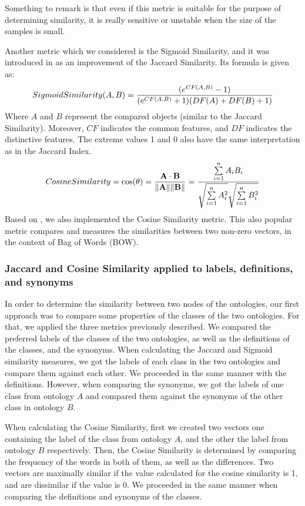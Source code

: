 \documentclass[runningheads]{llncs}
\begin{document}
Something to remark is that even if this metric is suitable for the purpose of determining similarity, it is really sensitive or unstable when the size of the samples is small. \cite{ref_url4}

Another metric which we considered is the Sigmoid Similarity, and it was introduced in \cite{Likavec} as an improvement of the Jaccard Similarity. Its formula is given as:
\small
\begin{equation}
    Sigmoid Similarity (A,B) = {{(e^{CF(A,B)} - 1)} \over{(e^{CF(A,B)} + 1) (DF(A) + DF(B) + 1)}}
\end{equation}
\normalsize
Where $A$ and $B$ represent the compared objects (similar to the Jaccard Similarity). Moreover, $CF$ indicates the common features, and $DF$ indicates the distinctive features. The extreme values 1 and 0 also have the same interpretation as in the Jaccard Index.
\small
\begin{equation}
  Cosine Similarity=\cos(\theta )={\mathbf {A} \cdot \mathbf {B}  \over \|\mathbf {A} \|\|\mathbf {B} \|}={\frac {\sum \limits _{i=1}^{n}{A_{i}B_{i}}}{{\sqrt {\sum \limits _{i=1}^{n}{A_{i}^{2}}}}{\sqrt {\sum \limits _{i=1}^{n}{B_{i}^{2}}}}}}
\end{equation}
\normalsize
Based on \cite{Oliveira}, we also implemented the Cosine Similarity metric. This also popular metric compares and measures the similarities between two non-zero vectors, in the context of Bag of Words (BOW).


\subsubsection{Jaccard and Cosine Similarity applied to labels, definitions, and synonyms} \label{jaccard_labels}
In order to determine the similarity between two nodes of the ontologies, our first approach was to compare some properties of the classes of the two ontologies. For that, we applied the three metrics previously described. We compared the preferred labels of the classes of the two ontologies, as well as the definitions of the classes, and the synonyms.
When calculating the Jaccard and Sigmoid similarity measures, we got the labels of each class in the two ontologies and compare them against each other. We proceeded in the same manner with the definitions. However, when comparing the synonyms, we got the labels of one class from ontology $A$ and compared them against the synonyms of the other class in ontology $B$.

When calculating the Cosine Similarity, first we created two vectors one containing the label of the class from ontology $A$, and the other the label from ontology $B$ respectively. Then, the Cosine Similarity is determined by comparing the frequency of the words in both of them, as well as the differences. Two vectors are maximally similar if the value calculated for the cosine similarity is 1, and are dissimilar if the value is 0. We proceeded in the same manner when comparing the definitions and synonyms of the classes.
\end{document}
